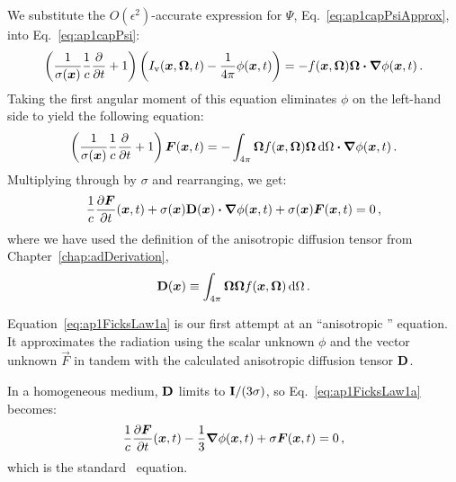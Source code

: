 We substitute the $O(\epsilon^2)$-accurate expression for $\Psi$,
Eq.~\eqref{eq:ap1capPsiApprox}, into Eq.~\eqref{eq:ap1capPsi}:
\begin{equation}\label{eq:ap1Interior1}
  \left( \frac{1}{\sigma(\bm{x})} \frac{1}{c}\frac{\partial }{\partial t} + 1 \right)
  \left( I_\mathrm{v}(\bm{x},\bm{\Omega},t) - \frac{1}{4\pi} \phi(\bm{x},t) \right)
  = - f(\bm{x},\bm{\Omega}) \bm{\Omega}\bm{\cdot} \bm{\nabla} \phi(\bm{x}, t) \,.
\end{equation}
Taking the first angular moment of this equation eliminates $\phi$ on the
left-hand side to yield the following equation:
\begin{equation}\label{eq:ap1FicksLaw1}
  \left( \frac{1}{\sigma(\bm{x})} \frac{1}{c}\frac{\partial }{\partial t} + 1 \right)
  \bm{F}(\bm{x},t) 
  = - \int_{4\pi} \bm{\Omega} f(\bm{x},\bm{\Omega}) \bm{\Omega} \mathop{}\!\mathrm{d}\Omega
  \bm{\cdot} \bm{\nabla} \phi(\bm{x}, t) \,.
\end{equation}
Multiplying through by $\sigma$ and rearranging, we get:
\begin{equation}\label{eq:ap1FicksLaw1a}
  \frac{1}{c}\frac{\partial \bm{F}}{\partial t}(\bm{x},t)
  + \sigma(\bm{x}) \mathbf{D}(\bm{x}) \bm{\cdot} \bm{\nabla} \phi(\bm{x}, t) 
  + \sigma(\bm{x})\bm{F}(\bm{x},t) 
  = 0 \,,
\end{equation}
where we have used the definition of the anisotropic diffusion tensor from
Chapter~\ref{chap:adDerivation},
\begin{equation}\label{eq:dDefinition_4}
  \mathbf{D}(\bm{x}) \equiv \int_{4\pi} \bm{\Omega} \bm{\Omega}
  f(\bm{x}, \bm{\Omega}) \mathop{}\!\mathrm{d}\Omega \,.
\end{equation}

Equation~\eqref{eq:ap1FicksLaw1a} is our first attempt at an ``anisotropic
\Pone'' equation. It approximates the radiation using the scalar unknown $\phi$
and the vector unknown $\vec{F}$ in tandem with the calculated anisotropic
diffusion tensor $\mathbf{D}$.

In a homogeneous medium, $\mathbf{D}$ limits to $\mathbf{I}/(3\sigma)$, so
Eq.~\eqref{eq:ap1FicksLaw1a} becomes:
\begin{equation*}
  \frac{1}{c}\frac{\partial \bm{F}}{\partial t}(\bm{x},t) - \frac{1}{3} \bm{\nabla}\phi(\bm{x}, t)
  + \sigma\bm{F}(\bm{x},t) 
  = 0\,,
\end{equation*}
which is the standard \Pone\ equation.


